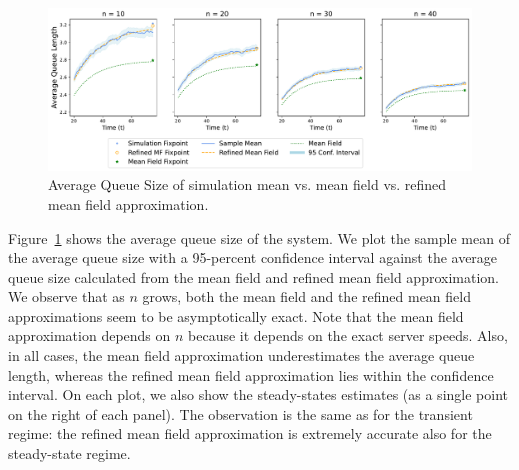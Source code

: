 \documentclass[acmsmall]{acmart}
\begin{document}
\begin{figure}[ht]
  \includegraphics[width=\textwidth]{average_queue_len}
  \caption{Average Queue Size of simulation mean vs. mean field vs. refined mean field approximation.}
  \label{fig:average_queue_size_fig}
\end{figure}

Figure~\ref{fig:average_queue_size_fig} shows the average queue size of the system. We plot the sample mean of the average queue size with a 95-percent confidence interval against the average queue size calculated from the mean field and refined mean field approximation. We observe that as $n$ grows, both the mean field and the refined mean field approximations seem to be asymptotically exact. Note that the mean field approximation depends on $n$ because it depends on the exact server speeds.  Also, in all cases, the mean field approximation underestimates the average queue length, whereas the refined mean field approximation lies within the confidence interval. On each plot, we also show the steady-states estimates (as a single point on the right of each panel). The observation is the same as for the transient regime: the refined mean field approximation is extremely accurate also for the steady-state regime.
\end{document}
